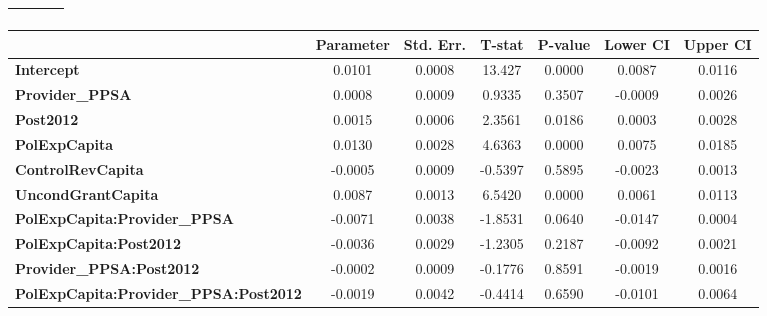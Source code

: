 \begin{center}
\begin{tabular}{lclc}
\textbf{}                                     &                    & \textbf{                     }   &                  \\
\bottomrule
\end{tabular}
\begin{tabular}{lcccccc}
                                              & \textbf{Parameter} & \textbf{Std. Err.} & \textbf{T-stat} & \textbf{P-value} & \textbf{Lower CI} & \textbf{Upper CI}  \\
\midrule
\textbf{Intercept}                            &       0.0101       &       0.0008       &      13.427     &      0.0000      &       0.0087      &       0.0116       \\
\textbf{Provider\_PPSA}                       &       0.0008       &       0.0009       &      0.9335     &      0.3507      &      -0.0009      &       0.0026       \\
\textbf{Post2012}                             &       0.0015       &       0.0006       &      2.3561     &      0.0186      &       0.0003      &       0.0028       \\
\textbf{PolExpCapita}                         &       0.0130       &       0.0028       &      4.6363     &      0.0000      &       0.0075      &       0.0185       \\
\textbf{ControlRevCapita}                     &      -0.0005       &       0.0009       &     -0.5397     &      0.5895      &      -0.0023      &       0.0013       \\
\textbf{UncondGrantCapita}                    &       0.0087       &       0.0013       &      6.5420     &      0.0000      &       0.0061      &       0.0113       \\
\textbf{PolExpCapita:Provider\_PPSA}          &      -0.0071       &       0.0038       &     -1.8531     &      0.0640      &      -0.0147      &       0.0004       \\
\textbf{PolExpCapita:Post2012}                &      -0.0036       &       0.0029       &     -1.2305     &      0.2187      &      -0.0092      &       0.0021       \\
\textbf{Provider\_PPSA:Post2012}              &      -0.0002       &       0.0009       &     -0.1776     &      0.8591      &      -0.0019      &       0.0016       \\
\textbf{PolExpCapita:Provider\_PPSA:Post2012} &      -0.0019       &       0.0042       &     -0.4414     &      0.6590      &      -0.0101      &       0.0064       \\
\bottomrule
\end{tabular}
\end{center}